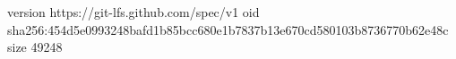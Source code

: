 version https://git-lfs.github.com/spec/v1
oid sha256:454d5e0993248bafd1b85bcc680e1b7837b13e670cd580103b8736770b62e48c
size 49248
